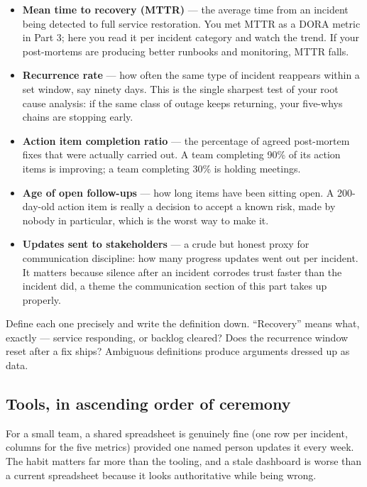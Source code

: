\begin{itemize}[leftmargin=*]
\item \textbf{Mean time to recovery (MTTR)} — the average time from an incident being detected to full service restoration. You met MTTR as a DORA metric in Part 3; here you read it per incident category and watch the trend. If your post-mortems are producing better runbooks and monitoring, MTTR falls.
\item \textbf{Recurrence rate} — how often the same type of incident reappears within a set window, say ninety days. This is the single sharpest test of your root cause analysis: if the same class of outage keeps returning, your five-whys chains are stopping early.
\item \textbf{Action item completion ratio} — the percentage of agreed post-mortem fixes that were actually carried out. A team completing 90\% of its action items is improving; a team completing 30\% is holding meetings.
\item \textbf{Age of open follow-ups} — how long items have been sitting open. A 200-day-old action item is really a decision to accept a known risk, made by nobody in particular, which is the worst way to make it.
\item \textbf{Updates sent to stakeholders} — a crude but honest proxy for communication discipline: how many progress updates went out per incident. It matters because silence after an incident corrodes trust faster than the incident did, a theme the communication section of this part takes up properly.
\end{itemize}

Define each one precisely and write the definition down. ``Recovery'' means what, exactly — service responding, or backlog cleared? Does the recurrence window reset after a fix ships? Ambiguous definitions produce arguments dressed up as data.



\subsection{Tools, in ascending order of ceremony}


For a small team, a shared spreadsheet is genuinely fine (one row per incident, columns for the five metrics) provided one named person updates it every week. The habit matters far more than the tooling, and a stale dashboard is worse than a current spreadsheet because it looks authoritative while being wrong.


